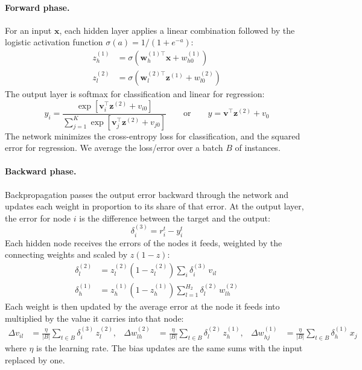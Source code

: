 \documentclass[twoside,11pt]{article}
\begin{document}
\paragraph{Forward phase.}For an input $\mathbf{x}$, each hidden layer applies a linear combination followed by the logistic activation function $\sigma(a) = 1/(1 + e^{-a})$:
\begin{align}
    z^{(1)}_h &= \sigma\!\left(\mathbf{w}^{(1)\top}_h \mathbf{x} + w^{(1)}_{h0}\right)\\
    z^{(2)}_l &= \sigma\!\left(\mathbf{w}^{(2)\top}_l \mathbf{z}^{(1)} + w^{(2)}_{l0}\right)
\end{align}
The output layer is softmax for classification and linear for regression:
\begin{equation}
    y_i = \frac{\exp\left[\mathbf{v}_i^{\top}\mathbf{z}^{(2)} + v_{i0}\right]}{\sum_{j=1}^{K}\exp\left[\mathbf{v}_j^{\top}\mathbf{z}^{(2)} + v_{j0}\right]}
    \qquad \text{or} \qquad
    y = \mathbf{v}^{\top}\mathbf{z}^{(2)} + v_{0}
\end{equation}
The network minimizes the cross-entropy loss for classification, and the squared error for regression. We average the loss/error over a batch $B$ of instances.

\paragraph{Backward phase.} Backpropagation passes the output error backward through the network and updates each weight in proportion to its share of that error. At the output layer, the error for node $i$ is the difference between the target and the output:
\begin{equation}
    \delta^{(3)}_i = r_i^t - y_i^t
\end{equation}
Each hidden node receives the errors of the nodes it feeds, weighted by the connecting weights and scaled by $z(1 - z)$:
\begin{align}
    \delta^{(2)}_l &= z^{(2)}_l\left(1 - z^{(2)}_l\right) \sum_{i} \delta^{(3)}_i \, v_{il} \\
    \delta^{(1)}_h &= z^{(1)}_h\left(1 - z^{(1)}_h\right) \sum_{l=1}^{H_2} \delta^{(2)}_l \, w^{(2)}_{lh}
\end{align}
Each weight is then updated by the average error at the node it feeds into multiplied by the value it carries into that node:
\begin{align}
    \Delta v_{il} &= \frac{\eta}{|B|}\sum_{t \in B}\delta^{(3)}_i\, z^{(2)}_l, &
    \Delta w^{(2)}_{lh} &= \frac{\eta}{|B|}\sum_{t \in B}\delta^{(2)}_l\, z^{(1)}_h, &
    \Delta w^{(1)}_{hj} &= \frac{\eta}{|B|}\sum_{t \in B}\delta^{(1)}_h\, x_j
\end{align}
where $\eta$ is the learning rate. The bias updates are the same sums with the input replaced by one.
\end{document}
